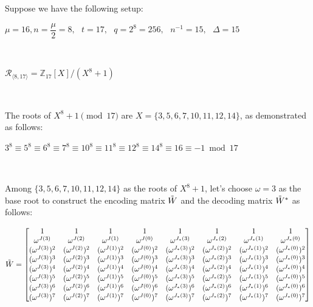 Suppose we have the following setup: 

$\mu = 16, n = \dfrac{\mu}{2} = 8, \text{ } t = 17, \text{ } q = 2^8 = 256, \text{ } n^{-1} = 15, \text{ } \Delta = 15$

$ $

$\mathcal{R}_{\langle 8, 17 \rangle} = \mathbb{Z}_{17}[X] / (X^8 + 1)$

$ $

The roots of $X^8 + 1 \pmod{17}$ are $X = \{3, 5, 6, 7, 10, 11, 12, 14\}$, as demonstrated as follows:

$3^8 \equiv 5^8 \equiv 6^8 \equiv 7^8 \equiv 10^8 \equiv 11^8 \equiv 12^8 \equiv 14^8 \equiv 16 \equiv -1 \bmod{17}$


$ $

Among $\{3, 5, 6, 7, 10, 11, 12, 14\}$ as the roots of $X^8 + 1$, let's choose $\omega = 3$ as the base root to construct the encoding matrix $\tilde{W}$ and the decoding matrix $\tilde{W}^*$ as follows: 

$\tilde{W} = \begin{bmatrix}
1 & 1 & 1 & 1 & 1 & 1 & 1 & 1\\
\omega^{J(3)} & \omega^{J(2)} & \omega^{J(1)} & \omega^{J(0)} & \omega^{J_*(3)} & \omega^{J_*(2)} & \omega^{J_*(1)} & \omega^{J_*(0)}\\
(\omega^{J(3)})^2 & (\omega^{J(2)})^2 & (\omega^{J(1)})^2 & (\omega^{J(0)})^2 & (\omega^{J_*(3)})^2 & (\omega^{J_*(2)})^2 & (\omega^{J_*(1)})^2 & (\omega^{J_*(0)})^2\\
(\omega^{J(3)})^3 & (\omega^{J(2)})^3 & (\omega^{J(1)})^3 & (\omega^{J(0)})^3 & (\omega^{J_*(3)})^3 & (\omega^{J_*(2)})^3 & (\omega^{J_*(1)})^3 & (\omega^{J_*(0)})^3\\
(\omega^{J(3)})^4 & (\omega^{J(2)})^4 & (\omega^{J(1)})^4 & (\omega^{J(0)})^4 & (\omega^{J_*(3)})^4 & (\omega^{J_*(2)})^4 & (\omega^{J_*(1)})^4 & (\omega^{J_*(0)})^4\\
(\omega^{J(3)})^5 & (\omega^{J(2)})^5 & (\omega^{J(1)})^5 & (\omega^{J(0)})^5 & (\omega^{J_*(3)})^5 & (\omega^{J_*(2)})^5 & (\omega^{J_*(1)})^5 & (\omega^{J_*(0)})^5\\
(\omega^{J(3)})^6 & (\omega^{J(2)})^6 & (\omega^{J(1)})^6 & (\omega^{J(0)})^6 & (\omega^{J_*(3)})^6 & (\omega^{J_*(2)})^6 & (\omega^{J_*(1)})^6 & (\omega^{J_*(0)})^6\\
(\omega^{J(3)})^7 & (\omega^{J(2)})^7 & (\omega^{J(1)})^7 & (\omega^{J(0)})^7 & (\omega^{J_*(3)})^7 & (\omega^{J_*(2)})^7 & (\omega^{J_*(1)})^7 & (\omega^{J_*(0)})^7\\
\end{bmatrix}$ 

